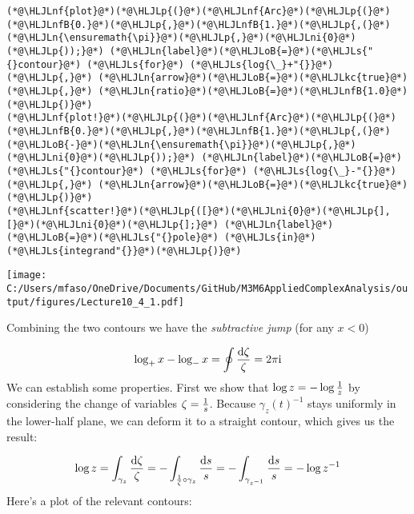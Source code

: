\documentclass[12pt,a4paper]{article}
\newcommand{\HLJLkc}[1]{\textcolor[RGB]{59,151,46}{\textit{#1}}}
\newcommand{\HLJLn}[1]{#1}
\newcommand{\HLJLnf}[1]{\textcolor[RGB]{66,102,213}{#1}}
\newcommand{\HLJLs}[1]{\textcolor[RGB]{201,61,57}{#1}}
\newcommand{\HLJLnfB}[1]{\textcolor[RGB]{59,151,46}{#1}}
\newcommand{\HLJLni}[1]{\textcolor[RGB]{59,151,46}{#1}}
\newcommand{\HLJLoB}[1]{\textcolor[RGB]{102,102,102}{\textbf{#1}}}
\newcommand{\HLJLp}[1]{#1}
\def\D{ {\rm d} }
\def\I{ {\rm i} }
\begin{document}
\begin{lstlisting}
(*@\HLJLnf{plot}@*)(*@\HLJLp{(}@*)(*@\HLJLnf{Arc}@*)(*@\HLJLp{(}@*)(*@\HLJLnfB{0.}@*)(*@\HLJLp{,}@*)(*@\HLJLnfB{1.}@*)(*@\HLJLp{,(}@*)(*@\HLJLn{\ensuremath{\pi}}@*)(*@\HLJLp{,}@*)(*@\HLJLni{0}@*)(*@\HLJLp{));}@*) (*@\HLJLn{label}@*)(*@\HLJLoB{=}@*)(*@\HLJLs{"{}contour}@*) (*@\HLJLs{for}@*) (*@\HLJLs{log{\_}+"{}}@*)(*@\HLJLp{,}@*) (*@\HLJLn{arrow}@*)(*@\HLJLoB{=}@*)(*@\HLJLkc{true}@*)(*@\HLJLp{,}@*) (*@\HLJLn{ratio}@*)(*@\HLJLoB{=}@*)(*@\HLJLnfB{1.0}@*)(*@\HLJLp{)}@*)
(*@\HLJLnf{plot!}@*)(*@\HLJLp{(}@*)(*@\HLJLnf{Arc}@*)(*@\HLJLp{(}@*)(*@\HLJLnfB{0.}@*)(*@\HLJLp{,}@*)(*@\HLJLnfB{1.}@*)(*@\HLJLp{,(}@*)(*@\HLJLoB{-}@*)(*@\HLJLn{\ensuremath{\pi}}@*)(*@\HLJLp{,}@*)(*@\HLJLni{0}@*)(*@\HLJLp{));}@*) (*@\HLJLn{label}@*)(*@\HLJLoB{=}@*)(*@\HLJLs{"{}contour}@*) (*@\HLJLs{for}@*) (*@\HLJLs{log{\_}-"{}}@*)(*@\HLJLp{,}@*) (*@\HLJLn{arrow}@*)(*@\HLJLoB{=}@*)(*@\HLJLkc{true}@*)(*@\HLJLp{)}@*)
(*@\HLJLnf{scatter!}@*)(*@\HLJLp{([}@*)(*@\HLJLni{0}@*)(*@\HLJLp{],[}@*)(*@\HLJLni{0}@*)(*@\HLJLp{];}@*) (*@\HLJLn{label}@*)(*@\HLJLoB{=}@*)(*@\HLJLs{"{}pole}@*) (*@\HLJLs{in}@*) (*@\HLJLs{integrand"{}}@*)(*@\HLJLp{)}@*)
\end{lstlisting}

\texttt{[image: C:/Users/mfaso/OneDrive/Documents/GitHub/M3M6AppliedComplexAnalysis/output/figures/Lecture10\_4\_1.pdf]}

Combining the two contours we have the \emph{subtractive jump} (for any $x < 0$)

\[
\log_+ x - \log_- x = \oint {\D\zeta \over \zeta}  = 2 \pi \I
\]
We can establish some properties. First we show that $\log z = - \log {1 \over z}$ by considering the change of variables $\zeta = {1 \over s}$.  Because $\gamma_z(t)^{-1}$ stays uniformly in the lower-half plane, we can deform it to a straight contour, which gives us the result:

\[
\log z = \int_{\gamma_z} {\D\zeta \over \zeta} = -\int_{{1 \over \zeta} \circ \gamma_z} {\D s \over s} = - \int_{\gamma_{z^{-1}}} {\D s \over s} = -\log z^{-1}
\]
Here's a plot of the relevant contours:
\end{document}

